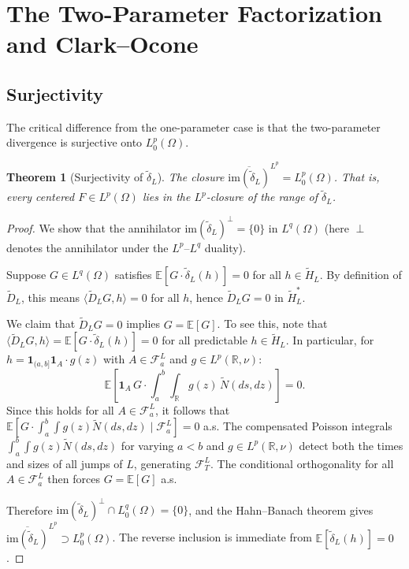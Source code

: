 \documentclass[11pt,a4paper]{article}
\theoremstyle{plain}
\newtheorem{theorem}{Theorem}[section]
\theoremstyle{definition}
\theoremstyle{remark}
\newcommand{\E}{\mathbb{E}}
\newcommand{\R}{\mathbb{R}}
\newcommand{\im}{\mathrm{im}}
\begin{document}
\section{The Two-Parameter Factorization and Clark--Ocone}
\label{sec:factorization}

\subsection{Surjectivity}

The critical difference from the one-parameter case is that the
two-parameter divergence is surjective onto $L^p_0(\Omega)$.

\begin{theorem}[Surjectivity of $\widetilde{\delta}_L$]
\label{thm:surjectivity}
The closure $\overline{\im(\widetilde{\delta}_L)}^{L^p}
= L^p_0(\Omega)$.  That is, every centered
$F \in L^p(\Omega)$ lies in the $L^p$-closure of the range
of $\widetilde{\delta}_L$.
\end{theorem}

\begin{proof}
We show that the annihilator
$\im(\widetilde{\delta}_L)^{\perp} = \{0\}$ in
$L^q(\Omega)$ (here $\perp$ denotes the annihilator
under the $L^p$--$L^q$ duality).

Suppose $G \in L^q(\Omega)$ satisfies
$\E[G \cdot \widetilde{\delta}_L(h)] = 0$ for all
$h \in \widetilde{H}_L$.  By definition of
$\widetilde{D}_L$, this means
$\langle \widetilde{D}_L G, h \rangle = 0$ for all $h$,
hence $\widetilde{D}_L G = 0$ in $\widetilde{H}_L^*$.

We claim that $\widetilde{D}_L G = 0$ implies
$G = \E[G]$.  To see this, note that
$\langle \widetilde{D}_L G, h \rangle
= \E[G \cdot \widetilde{\delta}_L(h)] = 0$ for all
predictable $h \in \widetilde{H}_L$.
In particular, for $h = \mathbf{1}_{(a,b]}\mathbf{1}_A
\cdot g(z)$ with $A \in \mathcal{F}_a^L$ and
$g \in L^p(\R, \nu)$:
\[
  \E\!\left[\mathbf{1}_A\,G \cdot \int_a^b\!\!\int_\R
  g(z)\,\widetilde{N}(ds,dz)\right] = 0.
\]
Since this holds for all $A \in \mathcal{F}_a^L$,
it follows that
$\E[G\cdot\int_a^b\!\int g(z)\widetilde{N}(ds,dz)
\mid\mathcal{F}_a^L] = 0$ a.s.
The compensated Poisson integrals
$\int_a^b\!\int g(z)\widetilde{N}(ds,dz)$ for varying
$a < b$ and $g \in L^p(\R,\nu)$ detect both the times
and sizes of all jumps of $L$, generating
$\mathcal{F}_T^L$.  The conditional orthogonality
for all $A \in \mathcal{F}_a^L$ then forces
$G = \E[G]$ a.s.

Therefore $\im(\widetilde{\delta}_L)^{\perp}
\cap L^q_0(\Omega) = \{0\}$, and the Hahn--Banach
theorem gives $\overline{\im(\widetilde{\delta}_L)}^{L^p}
\supset L^p_0(\Omega)$.  The reverse inclusion is
immediate from $\E[\widetilde{\delta}_L(h)] = 0$.
\end{proof}
\end{document}
